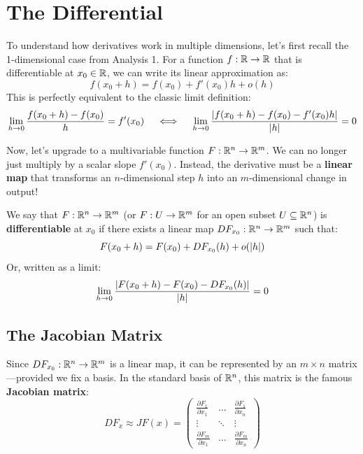 \setcounter{section}{3} %

\section{The Differential}

To understand how derivatives work in multiple dimensions, let's first recall the 1-dimensional case from Analysis 1. For a function $f: \mathbb{R} \to \mathbb{R}$ that is differentiable at $x_0 \in \mathbb{R}$, we can write its linear approximation as:
\[ f(x_0 + h) = f(x_0) + f'(x_0)h + o(h) \]
This is perfectly equivalent to the classic limit definition:
\[ \lim_{h \to 0} \frac{f(x_0 + h) - f(x_0)}{h} = f'(x_0) \quad \iff \quad \lim_{h \to 0} \frac{\lvert f(x_0 + h) - f(x_0) - f'(x_0)h\rvert}{\lvert h\rvert} = 0 \]

Now, let's upgrade to a multivariable function $F: \mathbb{R}^n \to \mathbb{R}^m$. We can no longer just multiply by a scalar slope $f'(x_0)$. Instead, the derivative must be a \textbf{linear map} that transforms an $n$-dimensional step $h$ into an $m$-dimensional change in output!

\begin{definition*}[Differentiability]
We say that $F: \mathbb{R}^n \to \mathbb{R}^m$ (or $F: U \to \mathbb{R}^m$ for an open subset $U \subseteq \mathbb{R}^n$) is \textbf{differentiable} at $x_0$ if there exists a linear map $DF_{x_0}: \mathbb{R}^n \to \mathbb{R}^m$ such that:
\[ F(x_0 + h) = F(x_0) + DF_{x_0}(h) + o(\lvert h\rvert) \]
Or, written as a limit:
\[ \lim_{h \to 0} \frac{\lvert F(x_0 + h) - F(x_0) - DF_{x_0}(h)\rvert}{\lvert h\rvert} = 0 \]
\end{definition*}


\subsection*{The Jacobian Matrix}

Since $DF_{x_0}: \mathbb{R}^n \to \mathbb{R}^m$ is a linear map, it can be represented by an $m \times n$ matrix—provided we fix a basis. In the standard basis of $\mathbb{R}^n$, this matrix is the famous \textbf{Jacobian matrix}:
\[ DF_x \approx JF(x) = \begin{pmatrix} 
\frac{\partial F_1}{\partial x_1} & \dots & \frac{\partial F_1}{\partial x_n} \\ 
\vdots & \ddots & \vdots \\ 
\frac{\partial F_m}{\partial x_1} & \dots & \frac{\partial F_m}{\partial x_n} 
\end{pmatrix} \]

